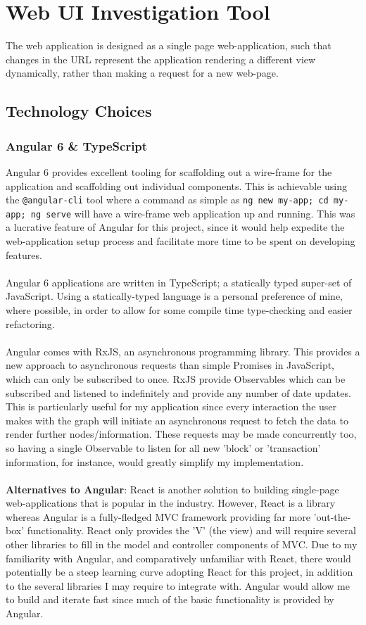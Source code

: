 \section{Web UI Investigation Tool}\label{section-investigation-tool}

The web application is designed as a single page web-application, such that changes in the URL represent the application rendering a different view dynamically, rather than making a request for a new web-page. 

\subsection{Technology Choices}
\subsubsection{Angular 6 \& TypeScript}
Angular 6 provides excellent tooling for scaffolding out a wire-frame for the application and scaffolding out individual components. This is achievable using the \texttt{@angular-cli} tool where a command as simple as \texttt{ng new my-app; cd my-app; ng serve} will have a wire-frame web application up and running. This was a lucrative feature of Angular for this project, since it would help expedite the web-application setup process and facilitate more time to be spent on developing features.
\\\\
Angular 6 applications are written in TypeScript; a statically typed super-set of JavaScript. Using a statically-typed language is a personal preference of mine, where possible, in order to allow for some compile time type-checking and easier refactoring. 
\\\\
Angular comes with RxJS, an asynchronous programming library. This provides a new approach to asynchronous requests than simple Promises in JavaScript, which can only be subscribed to once. RxJS provide Observables which can be subscribed and listened to indefinitely and provide any number of date updates. This is particularly useful for my application since every interaction the user makes with the graph will initiate an asynchronous request to fetch the data to render further nodes/information. These requests may be made concurrently too, so having a single Observable to listen for all new 'block' or 'transaction' information, for instance, would greatly simplify my implementation. 
\\\\
\textbf{Alternatives to Angular}: React is another solution to building single-page web-applications that is popular in the industry. However, React is a library whereas Angular is a fully-fledged MVC framework providing far more 'out-the-box' functionality. React only provides the 'V' (the view) and will require several other libraries to fill in the model and controller components of MVC. Due to my familiarity with Angular, and comparatively unfamiliar with React, there would potentially be a steep learning curve adopting React for this project, in addition to the several libraries I may require to integrate with. Angular would allow me to build and iterate fast since much of the basic functionality is provided by Angular.

